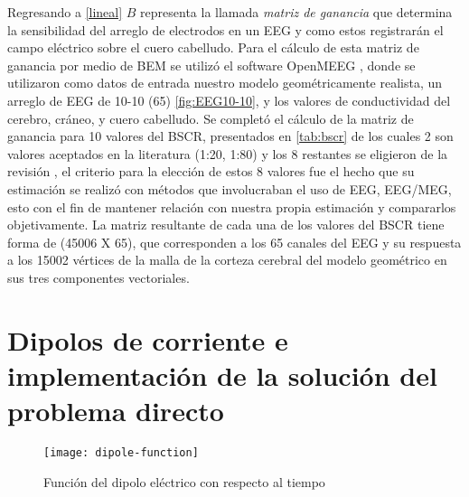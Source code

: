 Regresando a \cref{lineal} $B$ representa la llamada \emph{matriz de ganancia} que determina la sensibilidad del arreglo de electrodos en un EEG y como estos registrarán el campo eléctrico sobre el cuero cabelludo. Para el cálculo de esta matriz de ganancia por medio de BEM se utilizó el software OpenMEEG \cite{open,open2}, donde se utilizaron como datos de entrada nuestro modelo geométricamente realista, un arreglo de EEG de 10-10 (65) \cref{fig:EEG10-10}, y los valores de conductividad del cerebro, cráneo, y cuero cabelludo. Se completó el cálculo de la matriz de ganancia para 10 valores del BSCR, presentados en \cref{tab:bscr} de los cuales 2 son valores aceptados en la literatura (1:20, 1:80) y los 8 restantes se eligieron de la revisión \cite{McCann2019} , el criterio para la elección de estos 8 valores fue el hecho que su estimación se realizó con métodos que involucraban el uso de EEG, EEG/MEG, esto con el fin de mantener relación con nuestra propia estimación y compararlos objetivamente. La matriz resultante de cada una de los valores del BSCR tiene forma de (45006 X 65), que corresponden a los 65 canales del EEG y su respuesta a los 15002 vértices de la malla de la corteza cerebral del modelo geométrico en sus tres componentes vectoriales.



\section{Dipolos de corriente e implementación de la solución del problema directo}
\label{sec:methodology:direct_solved}


\begin{figure}[tb]
	\centering
	\texttt{[image: dipole-function]}
	\caption{Función del dipolo eléctrico con respecto al tiempo }
	\label{fig:methodology:dipole}
\end{figure}

